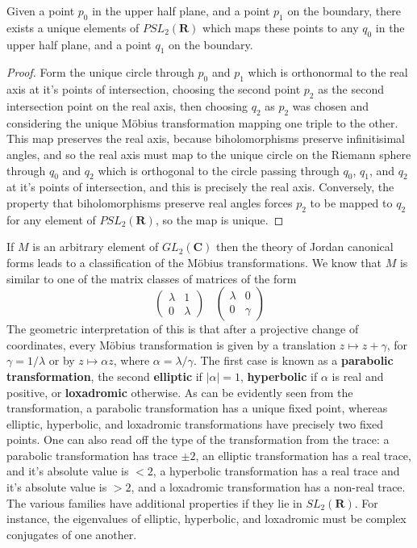 \begin{theorem}
    Given a point $p_0$ in the upper half plane, and a point $p_1$ on the boundary, there exists a unique elements of $PSL_2(\mathbf{R})$ which maps these points to any $q_0$ in the upper half plane, and a point $q_1$ on the boundary.
\end{theorem}
\begin{proof}
    Form the unique circle through $p_0$ and $p_1$ which is orthonormal to the real axis at it's points of intersection, choosing the second point $p_2$ as the second intersection point on the real axis, then choosing $q_2$ as $p_2$ was chosen and considering the unique M\"{o}bius transformation mapping one triple to the other. This map preserves the real axis, because biholomorphisms preserve infinitisimal angles, and so the real axis must map to the unique circle on the Riemann sphere through $q_0$ and $q_2$ which is orthogonal to the circle passing through $q_0$, $q_1$, and $q_2$ at it's points of intersection, and this is precisely the real axis. Conversely, the property that biholomorphisms preserve real angles forces $p_2$ to be mapped to $q_2$ for any element of $PSL_2(\mathbf{R})$, so the map is unique.
\end{proof}

If $M$ is an arbitrary element of $GL_2(\mathbf{C})$ then the theory of Jordan canonical forms leads to a classification of the M\"{o}bius transformations. We know that $M$ is similar to one of the matrix classes of matrices of the form
%
\[ \begin{pmatrix} \lambda & 1 \\ 0 & \lambda \end{pmatrix}\ \ \ \ \begin{pmatrix} \lambda & 0 \\ 0 & \gamma \end{pmatrix} \]
%
The geometric interpretation of this is that after a projective change of coordinates, every M\"{o}bius transformation is given by a translation $z \mapsto z + \gamma$, for $\gamma = 1/\lambda$ or by $z \mapsto \alpha z$, where $\alpha = \lambda / \gamma$. The first case is known as a {\bf parabolic transformation}, the second {\bf elliptic} if $|\alpha| = 1$, {\bf hyperbolic} if $\alpha$ is real and positive, or {\bf loxadromic} otherwise. As can be evidently seen from the transformation, a parabolic transformation has a unique fixed point, whereas elliptic, hyperbolic, and loxadromic transformations have precisely two fixed points. One can also read off the type of the transformation from the trace: a parabolic transformation has trace $\pm 2$, an elliptic transformation has a real trace, and it's absolute value is $< 2$, a hyperbolic transformation has a real trace and it's absolute value is $> 2$, and a loxadromic transformation has a non-real trace. The various families have additional properties if they lie in $SL_2(\mathbf{R})$. For instance, the eigenvalues of elliptic, hyperbolic, and loxadromic must be complex conjugates of one another.

